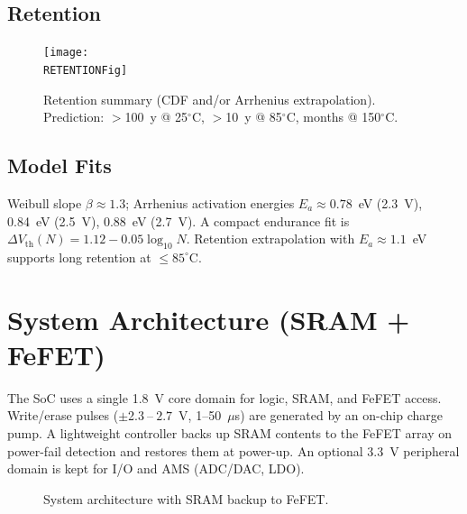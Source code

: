 \documentclass[conference]{IEEEtran}
\newcommand{\RETENTIONFig}{figures/retention_cdf_weibull.png}
\begin{document}
\subsection{Retention}
\begin{figure}[!t]
  \centering
  \texttt{[image: \\RETENTIONFig]}
  \caption{Retention summary (CDF and/or Arrhenius extrapolation). Prediction: $>$100~y @ 25$^\circ$C, $>$10~y @ 85$^\circ$C, months @ 150$^\circ$C.}
  \label{fig:retention}
\end{figure}

\subsection{Model Fits}
Weibull slope $\beta \approx 1.3$; Arrhenius activation energies $E_a \approx 0.78$~eV (2.3~V), 0.84~eV (2.5~V), 0.88~eV (2.7~V).
A compact endurance fit is $\Delta V_{\mathrm{th}}(N) = 1.12 - 0.05 \log_{10} N$.
Retention extrapolation with $E_a \approx 1.1$~eV supports long retention at $\le 85^\circ$C.

\section{System Architecture (SRAM + FeFET)}
The SoC uses a single 1.8~V core domain for logic, SRAM, and FeFET access.
Write/erase pulses ($\pm$2.3$~$--$~2.7$~V, 1--50~$\mu$s) are generated by an on-chip charge pump.
A lightweight controller backs up SRAM contents to the FeFET array on power-fail detection and restores them at power-up.
An optional 3.3~V peripheral domain is kept for I/O and AMS (ADC/DAC, LDO).

\begin{figure}[!t]
  \centering
  \caption{System architecture with SRAM backup to FeFET.}
  \label{fig:system}
\end{figure}
\end{document}
